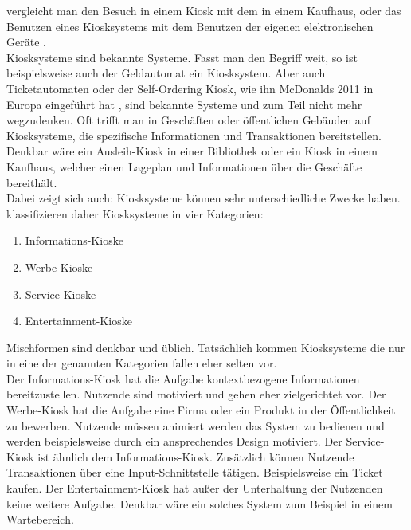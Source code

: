 vergleicht man den Besuch in einem Kiosk mit dem in einem Kaufhaus, oder das Benutzen eines Kiosksystems
mit dem Benutzen der eigenen elektronischen Geräte \cite{multimediale}.\\
Kiosksysteme sind bekannte Systeme. Fasst man den Begriff weit, so ist beispielsweise auch der Geldautomat ein Kiosksystem.
Aber auch Ticketautomaten oder der Self-Ordering Kiosk, wie ihn McDonalds 2011 in Europa 
eingeführt hat \cite{mcdonalds}, sind bekannte Systeme und zum Teil nicht mehr wegzudenken. Oft trifft man in 
Geschäften oder öffentlichen Gebäuden auf Kiosksysteme, die spezifische Informationen und Transaktionen 
bereitstellen. Denkbar wäre ein Ausleih-Kiosk in einer Bibliothek oder ein Kiosk in einem Kaufhaus, welcher einen
Lageplan und Informationen über die Geschäfte bereithält.\\
Dabei zeigt sich auch: Kiosksysteme können sehr unterschiedliche Zwecke haben.  klassifizieren daher
Kiosksysteme in vier Kategorien:

\begin{enumerate}
\item Informations-Kioske
\item Werbe-Kioske
\item Service-Kioske
\item Entertainment-Kioske
\end{enumerate}

Mischformen sind denkbar und üblich. Tatsächlich kommen Kiosksysteme die nur in eine der genannten Kategorien fallen
eher selten vor.\\
Der Informations-Kiosk hat die Aufgabe kontextbezogene Informationen bereitzustellen. Nutzende sind motiviert und
gehen eher zielgerichtet vor. 
Der Werbe-Kiosk hat die Aufgabe eine Firma oder ein Produkt in der Öffentlichkeit zu
bewerben. Nutzende müssen animiert werden das System zu bedienen und werden beispielsweise durch ein ansprechendes
Design motiviert.
Der Service-Kiosk ist ähnlich dem Informations-Kiosk. Zusätzlich können Nutzende Transaktionen über eine 
Input-Schnittstelle tätigen. Beispielsweise ein Ticket kaufen.
Der Entertainment-Kiosk hat außer der Unterhaltung der Nutzenden keine weitere Aufgabe. Denkbar wäre ein solches
System zum Beispiel in einem Wartebereich. 
